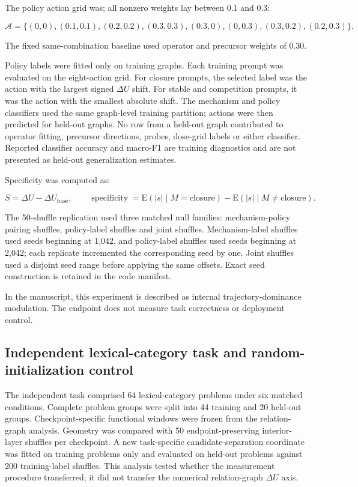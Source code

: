 \documentclass[11pt]{article}
\begin{document}
The policy action grid was; all nonzero weights lay between 0.1 and 0.3:

\begin{equation*}
\mathcal{A}=\{(0,0),(0.1,0.1),(0.2,0.2),(0.3,0.3),
(0.3,0),(0,0.3),(0.3,0.2),(0.2,0.3)\}.
\end{equation*}

The fixed same-combination baseline used operator and precursor weights of 0.30.

Policy labels were fitted only on training graphs. Each training prompt was evaluated on the eight-action grid. For closure prompts, the selected label was the action with the largest signed \(\Delta U\) shift. For stable and competition prompts, it was the action with the smallest absolute shift. The mechanism and policy classifiers used the same graph-level training partition; actions were then predicted for held-out graphs. No row from a held-out graph contributed to operator fitting, precursor directions, probes, dose-grid labels or either classifier. Reported classifier accuracy and macro-F1 are training diagnostics and are not presented as held-out generalization estimates.

Specificity was computed as:

\begin{equation*}
S=\Delta U-\Delta U_{\mathrm{base}},\qquad
\operatorname{specificity}=\mathrm{E}(|s|\mid M=\mathrm{closure})
-\mathrm{E}(|s|\mid M\neq\mathrm{closure}).
\end{equation*}

The 50-shuffle replication used three matched null families: mechanism-policy pairing shuffles, policy-label shuffles and joint shuffles. Mechanism-label shuffles used seeds beginning at 1,042, and policy-label shuffles used seeds beginning at 2,042; each replicate incremented the corresponding seed by one. Joint shuffles used a disjoint seed range before applying the same offsets. Exact seed construction is retained in the code manifest.

In the manuscript, this experiment is described as internal trajectory-dominance modulation. The endpoint does not measure task correctness or deployment control.


\subsection*{Independent lexical-category task and random-initialization control}
The independent task comprised 64 lexical-category problems under six matched conditions. Complete problem groups were split into 44 training and 20 held-out groups. Checkpoint-specific functional windows were frozen from the relation-graph analysis. Geometry was compared with 50 endpoint-preserving interior-layer shuffles per checkpoint. A new task-specific candidate-separation coordinate was fitted on training problems only and evaluated on held-out problems against 200 training-label shuffles. This analysis tested whether the measurement procedure transferred; it did not transfer the numerical relation-graph $\Delta U$ axis.
\end{document}
